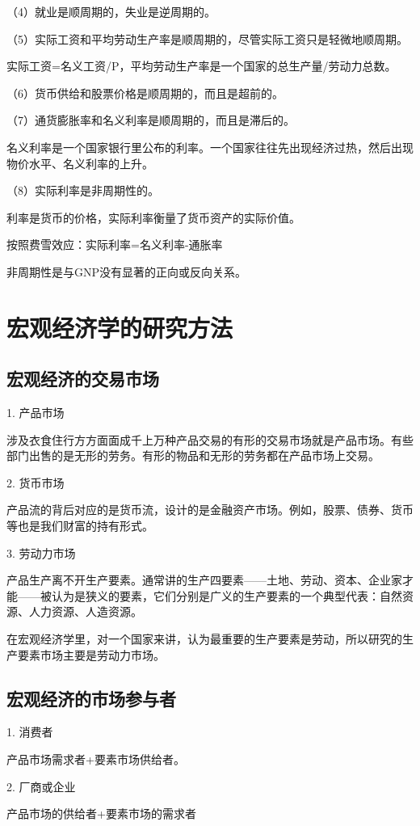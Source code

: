 \documentclass{article}
\begin{document}
（4）就业是顺周期的，失业是逆周期的。

（5）实际工资和平均劳动生产率是顺周期的，尽管实际工资只是轻微地顺周期。

实际工资=名义工资/P，平均劳动生产率是一个国家的总生产量/劳动力总数。

（6）货币供给和股票价格是顺周期的，而且是超前的。

（7）通货膨胀率和名义利率是顺周期的，而且是滞后的。

名义利率是一个国家银行里公布的利率。一个国家往往先出现经济过热，然后出现物价水平、名义利率的上升。

（8）实际利率是非周期性的。

利率是货币的价格，实际利率衡量了货币资产的实际价值。

按照费雪效应：实际利率=名义利率-通胀率

非周期性是与GNP没有显著的正向或反向关系。

\section{宏观经济学的研究方法}
\subsection{宏观经济的交易市场}
1. 产品市场

涉及衣食住行方方面面成千上万种产品交易的有形的交易市场就是产品市场。有些部门出售的是无形的劳务。有形的物品和无形的劳务都在产品市场上交易。

2. 货币市场

产品流的背后对应的是货币流，设计的是金融资产市场。例如，股票、债券、货币等也是我们财富的持有形式。

3. 劳动力市场

产品生产离不开生产要素。通常讲的生产四要素——土地、劳动、资本、企业家才能——被认为是狭义的要素，它们分别是广义的生产要素的一个典型代表：自然资源、人力资源、人造资源。

在宏观经济学里，对一个国家来讲，认为最重要的生产要素是劳动，所以研究的生产要素市场主要是劳动力市场。

\subsection{宏观经济的市场参与者}
1. 消费者

产品市场需求者+要素市场供给者。

2. 厂商或企业

产品市场的供给者+要素市场的需求者
\end{document}
